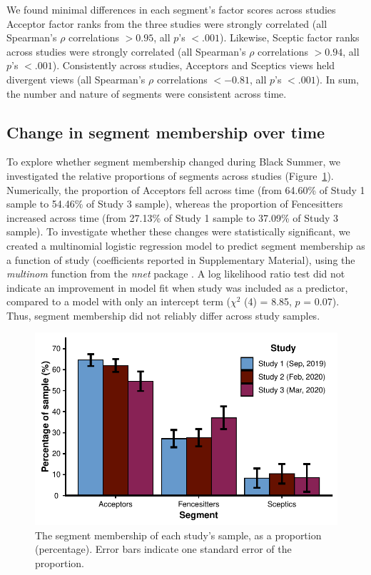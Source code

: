 \documentclass[
  letterpaper,
  DIV=11,
  numbers=noendperiod]{scrartcl}
\begin{document}
We found minimal differences in each segment's factor scores across
studies Acceptor factor ranks from the three studies were strongly
correlated (all Spearman's \(\rho\) correlations \(> 0.95\), all \(p\)'s
\(< .001\)). Likewise, Sceptic factor ranks across studies were strongly
correlated (all Spearman's \(\rho\) correlations \(> 0.94\), all \(p\)'s
\(< .001\)). Consistently across studies, Acceptors and Sceptics views
held divergent views (all Spearman's \(\rho\) correlations \(< -0.81\),
all \(p\)'s \(< .001\)). In sum, the number and nature of segments were
consistent across time.

\hypertarget{change-in-segment-membership-over-time}{%
\subsection{Change in segment membership over
time}\label{change-in-segment-membership-over-time}}

To explore whether segment membership changed during Black Summer, we
investigated the relative proportions of segments across studies
(Figure~\ref{fig-segment-change}). Numerically, the proportion of
Acceptors fell across time (from 64.60\% of Study 1 sample to 54.46\% of
Study 3 sample), whereas the proportion of Fencesitters increased across
time (from 27.13\% of Study 1 sample to 37.09\% of Study 3 sample). To
investigate whether these changes were statistically significant, we
created a multinomial logistic regression model to predict segment
membership as a function of study (coefficients reported in
Supplementary Material), using the \emph{multinom} function from the
\emph{nnet} package \citep{venables_2002}. A log likelihood ratio test
did not indicate an improvement in model fit when study was included as
a predictor, compared to a model with only an intercept term
(\(\chi^{2}\) (4) = 8.85, \(p\) = 0.07). Thus, segment membership did
not reliably differ across study samples.

\begin{figure}

{\centering \includegraphics{analysis_files/figure-pdf/fig-segment-change-1.pdf}

}

\caption{\label{fig-segment-change}The segment membership of each
study's sample, as a proportion (percentage). Error bars indicate one
standard error of the proportion.}

\end{figure}
\end{document}
